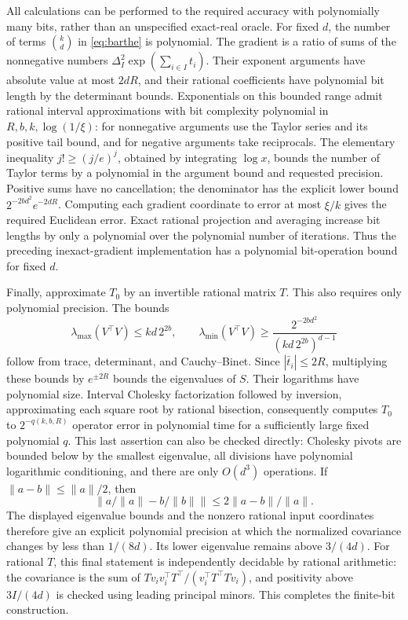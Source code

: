 \documentclass[11pt]{article}
\newcommand{\1}{\mathbf 1}
\begin{document}
All calculations can be performed to the required accuracy with polynomially many bits, rather than an unspecified exact-real oracle. For fixed $d$, the number of terms $\binom kd$ in \eqref{eq:barthe} is polynomial. The gradient is a ratio of sums of the nonnegative numbers $\Delta_I^2\exp(\sum_{i\in I}t_i)$. Their exponent arguments have absolute value at most $2dR$, and their rational coefficients have polynomial bit length by the determinant bounds. Exponentials on this bounded range admit rational interval approximations with bit complexity polynomial in $R,b,k,\log(1/\xi)$: for nonnegative arguments use the Taylor series and its positive tail bound, and for negative arguments take reciprocals. The elementary inequality $j!\ge(j/e)^j$, obtained by integrating $\log x$, bounds the number of Taylor terms by a polynomial in the argument bound and requested precision. Positive sums have no cancellation; the denominator has the explicit lower bound $2^{-2bd^2}e^{-2dR}$. Computing each gradient coordinate to error at most $\xi/k$ gives the required Euclidean error. Exact rational projection and averaging increase bit lengths by only a polynomial over the polynomial number of iterations. Thus the preceding inexact-gradient implementation has a polynomial bit-operation bound for fixed $d$.

Finally, approximate $T_0$ by an invertible rational matrix $T$. This also requires only polynomial precision. The bounds
\[
 \lambda_{\max}(V^\top V)\le kd\,2^{2b},\qquad
 \lambda_{\min}(V^\top V)\ge
 \frac{2^{-2bd^2}}{(kd\,2^{2b})^{d-1}}
\]
follow from trace, determinant, and Cauchy--Binet. Since $|\bar t_i|\le2R$, multiplying these bounds by $e^{\pm2R}$ bounds the eigenvalues of $S$. Their logarithms have polynomial size. Interval Cholesky factorization followed by inversion, approximating each square root by rational bisection, consequently computes $T_0$ to $2^{-q(k,b,R)}$ operator error in polynomial time for a sufficiently large fixed polynomial $q$. This last assertion can also be checked directly: Cholesky pivots are bounded below by the smallest eigenvalue, all divisions have polynomial logarithmic conditioning, and there are only $O(d^3)$ operations. If $\|a-b\|\le\|a\|/2$, then
\[
 \left\|a/\|a\|-b/\|b\|\right\|\le2\|a-b\|/\|a\|.
\]
The displayed eigenvalue bounds and the nonzero rational input coordinates therefore give an explicit polynomial precision at which the normalized covariance changes by less than $1/(8d)$. Its lower eigenvalue remains above $3/(4d)$. For rational $T$, this final statement is independently decidable by rational arithmetic: the covariance is the sum of $Tv_iv_i^\top T^\top/(v_i^\top T^\top Tv_i)$, and positivity above $3I/(4d)$ is checked using leading principal minors. This completes the finite-bit construction.
\end{document}
